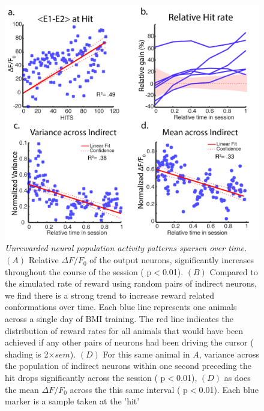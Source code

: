 \documentclass[letterpaper, 10 pt, conference]{ieeeconf}  %
\begin{document}
   \begin{figure}[thpb]
      \centering
      \includegraphics[scale=.52]{figures/figure02.png}
      \caption{\emph{Unrewarded neural population activity patterns sparsen over time.} $(A)$ Relative $\Delta F/F_{0}$  of the output neurons, significantly increases throughout the course of the session ( p$<$0.01). $(B)$ Compared to the simulated rate of reward using random pairs of indirect neurons, we find there is a strong trend to increase reward related conformations over time.  Each blue line represents one animals across a single day of BMI training. The red line indicates the distribution of reward rates for all animals that would have been achieved if any other pairs of neurons had been driving the cursor ( shading is 2$\times sem$). $(D)$ For this same animal in $A$, variance across the population of indirect neurons within one second preceding the hit drops significantly across the session ( p$<$0.01), $(D)$ as does the mean $\Delta F/F_{0}$ across the this same interval ( p$<$0.01). Each blue marker is a sample taken at the 'hit'}
      \label{figurelabel}
   \end{figure}
  
\end{document}

